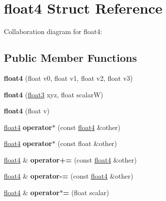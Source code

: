 \hypertarget{structfloat4}{\section{float4 Struct Reference}
\label{structfloat4}
}


Collaboration diagram for float4\+:
\subsection*{Public Member Functions}
\begin{DoxyCompactItemize}
\item 
\hypertarget{structfloat4_adb219b38e74193fe2e98ec7964e07d55}{{\bfseries float4} (float v0, float v1, float v2, float v3)}\label{structfloat4_adb219b38e74193fe2e98ec7964e07d55}

\item 
\hypertarget{structfloat4_af3ff0e4ce918917edbddb986492ec06b}{{\bfseries float4} (\hyperlink{structfloat3}{float3} xyz, float scalar\+W)}\label{structfloat4_af3ff0e4ce918917edbddb986492ec06b}

\item 
\hypertarget{structfloat4_a25dc2c3d9a1346d00a6cd0b3151678de}{{\bfseries float4} (float v)}\label{structfloat4_a25dc2c3d9a1346d00a6cd0b3151678de}

\item 
\hypertarget{structfloat4_abe286c01f9d43ef28ee4e91a92decac8}{\hyperlink{structfloat4}{float4} {\bfseries operator$\ast$} (const \hyperlink{structfloat4}{float4} \&other)}\label{structfloat4_abe286c01f9d43ef28ee4e91a92decac8}

\item 
\hypertarget{structfloat4_a30e515d290f70a576587b2425afce6d5}{\hyperlink{structfloat4}{float4} {\bfseries operator$\ast$} (const float \&other)}\label{structfloat4_a30e515d290f70a576587b2425afce6d5}

\item 
\hypertarget{structfloat4_a4731852308754d782778c50868140ab6}{\hyperlink{structfloat4}{float4} \& {\bfseries operator+=} (const \hyperlink{structfloat4}{float4} \&other)}\label{structfloat4_a4731852308754d782778c50868140ab6}

\item 
\hypertarget{structfloat4_a6c51914f994cd5c04edb6b47b28fb7f4}{\hyperlink{structfloat4}{float4} \& {\bfseries operator-\/=} (const \hyperlink{structfloat4}{float4} \&other)}\label{structfloat4_a6c51914f994cd5c04edb6b47b28fb7f4}

\item 
\hypertarget{structfloat4_ae3edbdfcd8ae9e66806e859fac1dc82e}{\hyperlink{structfloat4}{float4} \& {\bfseries operator$\ast$=} (float scalar)}\label{structfloat4_ae3edbdfcd8ae9e66806e859fac1dc82e}

\end{DoxyCompactItemize}
